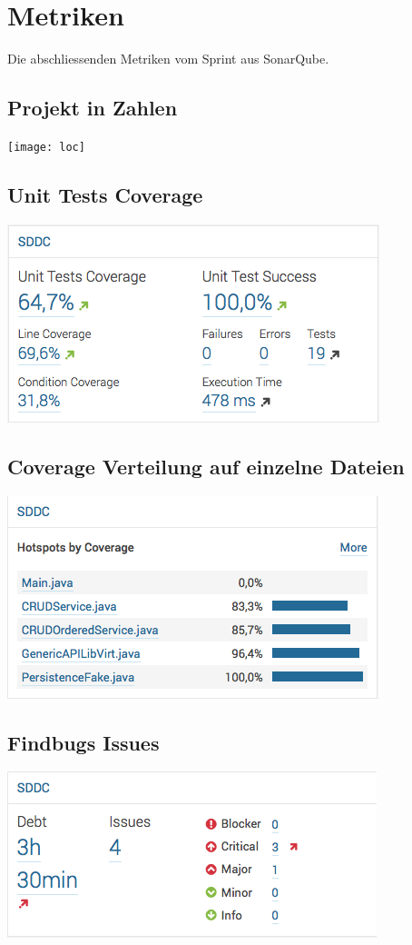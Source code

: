 \newpage

\section{Metriken}
Die abschliessenden Metriken vom Sprint aus SonarQube.
\subsection{Projekt in Zahlen}
\texttt{[image: loc]}

\subsection{Unit Tests Coverage}
\includegraphics[]{./10_Protokolle/04_Testprotokoll/images/Sprint1/coverage}

\subsection{Coverage Verteilung auf einzelne Dateien}
\includegraphics[]{./10_Protokolle/04_Testprotokoll/images/Sprint1/covergaeperfile}

\subsection{Findbugs Issues}
\includegraphics[]{./10_Protokolle/04_Testprotokoll/images/Sprint1/issues}
